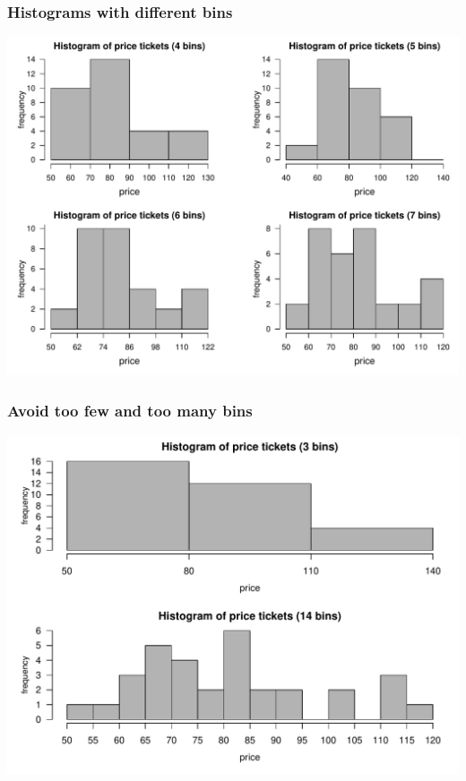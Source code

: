 \documentclass[12pt]{beamer}\usepackage[]{graphicx}\usepackage[]{color}
\newenvironment{knitrout}{}{} %
\begin{document}
\begin{frame}[fragile]
\frametitle{Histograms with different bins}
\begin{knitrout}\footnotesize
{}\color{fgcolor}

{\centering \includegraphics[width=.9\linewidth,height=.7\linewidth]{figure/unnamed-chunk-20-1} 

}



\end{knitrout}

\end{frame}


\begin{frame}[fragile]
\frametitle{Avoid too few and too many bins}
\begin{knitrout}\footnotesize
{}\color{fgcolor}

{\centering \includegraphics[width=.9\linewidth,height=.7\linewidth]{figure/unnamed-chunk-21-1} 

}



\end{knitrout}

\end{frame}
\end{document}
